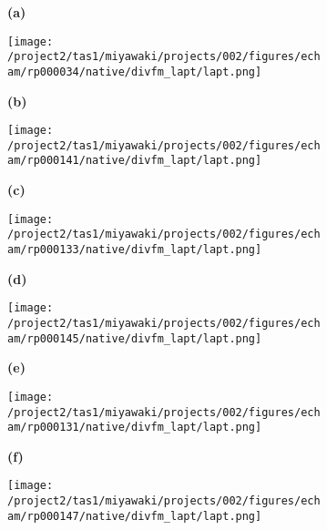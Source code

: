 \documentclass[preview]{standalone}
\begin{document}
\begin{figure}
  \begin{subfigure}[t]{0.05\textwidth}
    \textbf{\normalsize{(a)}}
  \end{subfigure}
  \begin{subfigure}[t]{0.45\textwidth}
    \texttt{[image: /project2/tas1/miyawaki/projects/002/figures/echam/rp000034/native/divfm\_lapt/lapt.png]}
  \end{subfigure}
  \begin{subfigure}[t]{0.05\textwidth}
    \textbf{\normalsize{(b)}}
  \end{subfigure}
  \begin{subfigure}[t]{0.45\textwidth}
    \texttt{[image: /project2/tas1/miyawaki/projects/002/figures/echam/rp000141/native/divfm\_lapt/lapt.png]}
  \end{subfigure}
  
  \begin{subfigure}[t]{0.05\textwidth}
    \textbf{\normalsize{(c)}}
  \end{subfigure}
  \begin{subfigure}[t]{0.45\textwidth}
    \texttt{[image: /project2/tas1/miyawaki/projects/002/figures/echam/rp000133/native/divfm\_lapt/lapt.png]}
  \end{subfigure}
  \begin{subfigure}[t]{0.05\textwidth}
    \textbf{\normalsize{(d)}}
  \end{subfigure}
  \begin{subfigure}[t]{0.45\textwidth}
    \texttt{[image: /project2/tas1/miyawaki/projects/002/figures/echam/rp000145/native/divfm\_lapt/lapt.png]}
  \end{subfigure}
  
  \begin{subfigure}[t]{0.05\textwidth}
    \textbf{\normalsize{(e)}}
  \end{subfigure}
  \begin{subfigure}[t]{0.45\textwidth}
    \texttt{[image: /project2/tas1/miyawaki/projects/002/figures/echam/rp000131/native/divfm\_lapt/lapt.png]}
  \end{subfigure}
  \begin{subfigure}[t]{0.05\textwidth}
    \textbf{\normalsize{(f)}}
  \end{subfigure}
  \begin{subfigure}[t]{0.45\textwidth}
    \texttt{[image: /project2/tas1/miyawaki/projects/002/figures/echam/rp000147/native/divfm\_lapt/lapt.png]}
  \end{subfigure}


\end{figure}
\end{document}
